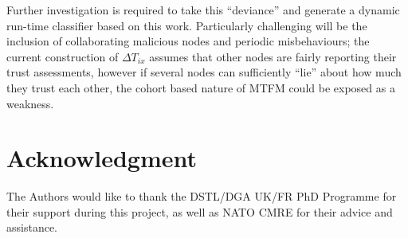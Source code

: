 \documentclass[conference]{IEEEtran}
\begin{document}
Further investigation is required to take this ``deviance'' and generate a dynamic run-time classifier based on this work. 
Particularly challenging will be the inclusion of collaborating malicious nodes and periodic misbehaviours; the current construction of $\Delta T_{ix}$ assumes that other nodes are fairly reporting their trust assessments, however if several nodes can sufficiently ``lie'' about how much they trust each other, the cohort based nature of MTFM could be exposed as a weakness.  






\section*{Acknowledgment}

The Authors would like to thank the DSTL/DGA UK/FR PhD Programme for their support during this project, as well as NATO CMRE for their advice and assistance.




\end{document}
